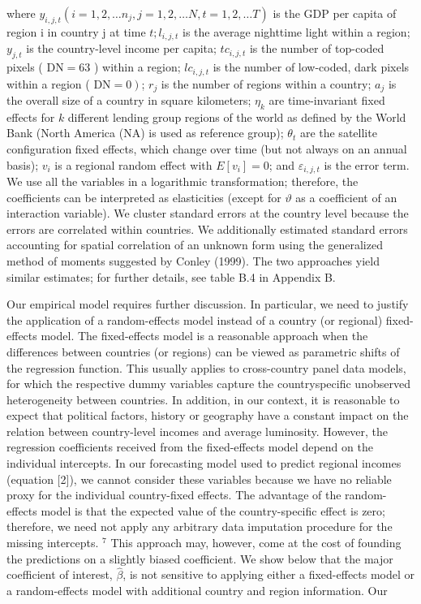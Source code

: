 \documentclass[10pt]{article}
\begin{document}
where $y_{i, j, t}\left(i=1,2, \ldots n_{j}, j=1,2, \ldots N, t=1,2, \ldots T\right)$ is the GDP per capita of region $\mathrm{i}$ in country $\mathrm{j}$ at time $t ; l_{i, j, t}$ is the average nighttime light within a region; $y_{j, t}$ is the country-level income per capita; $t c_{i, j, t}$ is the number of top-coded pixels ( $\mathrm{DN}=63$ ) within a region; $l c_{i, j, t}$ is the number of low-coded, dark pixels within a region ( $\left.\mathrm{DN}=0\right)$; $r_{j}$ is the number of regions within a country; $a_{j}$ is the overall size of a country in square kilometers; $\eta_{k}$ are time-invariant fixed effects for $k$ different lending group regions of the world as defined by the World Bank (North America (NA) is used as reference group); $\theta_{t}$ are the satellite configuration fixed effects, which change over time (but not always on an annual basis); $v_{i}$ is a regional random effect with $E\left[v_{i}\right]=0$; and $\varepsilon_{i, j, t}$ is the error term. We use all the variables in a logarithmic transformation; therefore, the coefficients can be interpreted as elasticities (except for $\vartheta$ as a coefficient of an interaction variable). We cluster standard errors at the country level because the errors are correlated within countries. We additionally estimated standard errors accounting for spatial correlation of an unknown form using the generalized method of moments suggested by Conley (1999). The two approaches yield similar estimates; for further details, see table B.4 in Appendix B.

Our empirical model requires further discussion. In particular, we need to justify the application of a random-effects model instead of a country (or regional) fixed-effects model. The fixed-effects model is a reasonable approach when the differences between countries (or regions) can be viewed as parametric shifts of the regression function. This usually applies to cross-country panel data models, for which the respective dummy variables capture the countryspecific unobserved heterogeneity between countries. In addition, in our context, it is reasonable to expect that political factors, history or geography have a constant impact on the relation between country-level incomes and average luminosity. However, the regression coefficients received from the fixed-effects model depend on the individual intercepts. In our forecasting model used to predict regional incomes (equation [2]), we cannot consider these variables because we have no reliable proxy for the individual country-fixed effects. The advantage of the random-effects model is that the expected value of the country-specific effect is zero; therefore, we need not apply any arbitrary data imputation procedure for the missing intercepts. ${ }^{7}$ This approach may, however, come at the cost of founding the predictions on a slightly biased coefficient. We show below that the major coefficient of interest, $\hat{\beta}$, is not sensitive to applying either a fixed-effects model or a random-effects model with additional country and region information. Our
\end{document}
